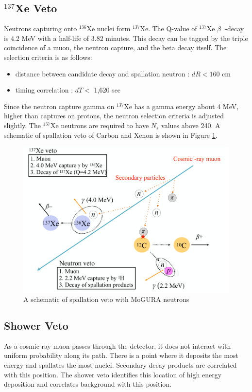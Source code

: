 \subsection*{$^{137}$Xe Veto}
Neutrons capturing onto $^{136}$Xe nuclei form $^{137}$Xe. The Q-value of $^{137}$Xe $\beta^-$-decay is 4.2 MeV with a half-life of 3.82 minutes. This decay can be tagged by the triple coincidence of a muon, the neutron capture, and the beta decay itself. The selection criteria is as follows:
\begin{itemize}
	\item distance between candidate decay and spallation neutron : $dR<160$ cm
	\item timing correlation : $dT < $ 1,620 sec
\end{itemize}

Since the neutron capture gamma on $^{137}$Xe has a gamma energy about 4 MeV, higher than captures on protons, the neutron selection criteria is adjusted slightly. The $^{137}$Xe neutrons are required to have $N_s$ values above 240. A schematic of spallation veto of Carbon and Xenon is shown in Figure \ref{fig:spall_veto}.
\begin{figure}[htb]
	\centering
	\includegraphics[scale=0.35]{spall_veto.png}
	\caption{A schematic of spallation veto with MoGURA neutrons}
	\label{fig:spall_veto}
\end{figure}

\subsection{Shower Veto}
As a cosmic-ray muon passes through the detector, it does not interact with uniform probability along its path. There is a point where it deposits the most energy and spallates the most nuclei. Secondary decay products are correlated with this position. The shower veto identifies this location of high energy deposition and correlates background with this position.
